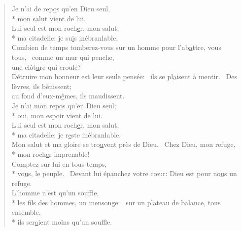
\begin{verse}
Je n’ai de rep\underline{o}s qu’en Dieu seul, \\*
mon sal\underline{u}t vient de lui. \\

Lui seul est mon roch\underline{e}r, mon salut, \\*
ma citadelle: je su\underline{i}s inébranlable. \\

Combien de temps tomberez-vous sur un homme
pour l’ab\underline{a}ttre, vous tous,~\psalmstar
comme un mur qui penche, \\
une clôt\underline{u}re qui croule? \\

Détruire mon honneur est leur seule pensée:~\psalmdagger
ils se pl\underline{a}isent à mentir.~\psalmstar
Des lèvres, ils bénissent; \\
au fond d’eux-m\underline{ê}mes, ils maudissent. \\

Je n’ai mon rep\underline{o}s qu’en Dieu seul; \\*
oui, mon esp\underline{o}ir vient de lui. \\

Lui seul est mon roch\underline{e}r, mon salut, \\*
ma citadelle: je r\underline{e}ste inébranlable. \\

Mon salut et ma gloire
se tro\underline{u}vent près de Dieu.~\psalmstar
Chez Dieu, mon refuge, \\*
mon roch\underline{e}r imprenable! \\

Comptez sur lui en tous temps, \\*
vo\underline{u}s, le peuple.~\psalmstar
Devant lui épanchez votre cœur:
Dieu est pour no\underline{u}s un refuge. \\

L’homme n’est qu’un souffle, \\*
les fils des h\underline{o}mmes, un mensonge:~\psalmstar
sur un plateau de balance, tous ensemble, \\*
ils ser\underline{a}ient moins qu’un souffle. \\


\end{verse}
